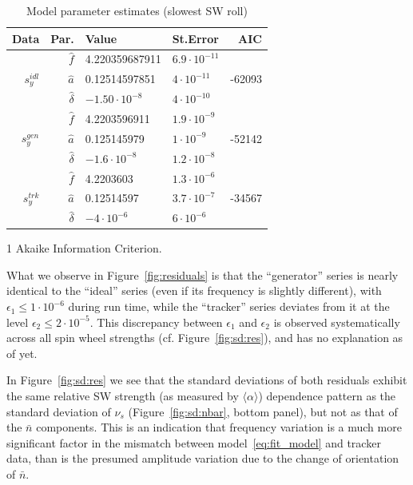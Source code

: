 \documentclass[a4paper]{jacow}
\newcommand{\avg}[1]{\langle {#1} \rangle}
\newcommand{\nbar}{\bar n}
\begin{document}
\begin{table}[h]
  \caption{Model parameter estimates (slowest SW roll)\label{tbl:param_estimates}}
  \begin{threeparttable}
    \begin{tabular}{r|rllr}
      \toprule
      Data & Par. & Value & St.Error & AIC\tnote{1} \\
      \midrule
      \multirow{3}{*}{$s_y^{idl}$}
      & $\hat f$ & 4.220359687911 & $6.9\cdot 10^{-11}$ & \multirow{3}{*}{-62093} \\
      & $\hat a$ & 0.12514597851 & $4\cdot 10^{-11}$ & \\
      & $\hat\delta$ & $-1.50\cdot 10^{-8}$ & $4\cdot 10^{-10}$ &\\
      \hline
      \multirow{3}{*}{$s_y^{gen}$}
      & $\hat f$ & 4.2203596911 & $1.9\cdot 10^{-9}$ & \multirow{3}{*}{-52142} \\
      & $\hat a$ & 0.125145979 & $1\cdot 10^{-9}$ & \\
      & $\hat\delta$ & $-1.6\cdot 10^{-8}$ & $1.2\cdot 10^{-8}$ &\\
      \hline
      \multirow{3}{*}{$s_y^{trk}$}
      & $\hat f$ & 4.2203603 & $1.3\cdot 10^{-6}$ & \multirow{3}{*}{-34567} \\
      & $\hat a$ & 0.12514597 & $3.7\cdot 10^{-7}$ & \\
      & $\hat\delta$ & $-4\cdot 10^{-6}$ & $6\cdot 10^{-6}$ &\\
      \bottomrule
    \end{tabular}
    \begin{tablenotes}
      \item[1] Akaike Information Criterion.
    \end{tablenotes}
  \end{threeparttable}
\end{table}

What we observe in Figure~\ref{fig:residuals} is that the ``generator'' series is nearly identical
to the ``ideal'' series (even if its frequency is slightly different), with $\epsilon_1 \le 1\cdot10^{-6}$
during run time,
while the ``tracker'' series deviates from it at the level
$\epsilon_2 \le 2\cdot 10^{-5}$. This discrepancy between $\epsilon_1$ and $\epsilon_2$ is observed
systematically across all spin wheel strengths (cf. Figure~\ref{fig:sd:res}), and has no explanation as of yet.

In Figure~\ref{fig:sd:res} we see that the standard deviations of both residuals exhibit the same
relative SW strength (as measured by $\avg{\alpha}$) dependence pattern as
the standard deviation of $\nu_s$ (Figure~\ref{fig:sd:nbar}, bottom panel), but not as that of
the $\nbar$ components. This is an indication that frequency variation is a much more significant factor
in the mismatch between model~\eqref{eq:fit_model} and tracker data, than is the presumed amplitude variation
due to the change of orientation of $\nbar$.
\end{document}
